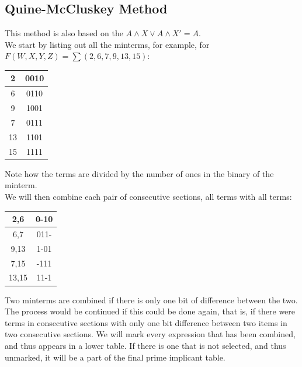 \documentclass[nobib]{tufte-handout}
\begin{document}
    \subsection{Quine-McCluskey Method}
    This method is also based on the $A\land X \lor A\land X' = A$.\\ We start by
    listing out all the minterms, for example, for $F(W,X,Y,Z) = \sum
(2,6,7,9,13,15)$:\\
    \begin{table}
        \centering
        \begin{tabular}{c c}
            2  & 0010 \\
            \hline
            6  & 0110 \\
            9  & 1001 \\
            \hline
            7  & 0111 \\
            13 & 1101 \\
            \hline
            15 & 1111
        \end{tabular}
    \end{table}
    Note how the terms are divided by the number of ones in the binary of the minterm.\\
    We will then combine each pair of consecutive sections, all terms with all terms:\\
    \begin{table}
        \centering
        \begin{tabular}{c c}
            2,6   & 0-10 \\
            \hline
            6,7   & 011- \\
            9,13  & 1-01 \\
            \hline
            7,15  & -111 \\
            13,15 & 11-1 \\
        \end{tabular}
    \end{table}
    Two minterms are combined if there is only one bit of difference between the two. The process would be continued if this could be done again, that is, if there were terms in consecutive sections with only one bit difference between two items in two consecutive sections. We will mark every expression that has been combined, and thus appears in a lower table. If there is one that is not selected, and thus unmarked, it will be a part of the final prime implicant table.\\
\end{document}
